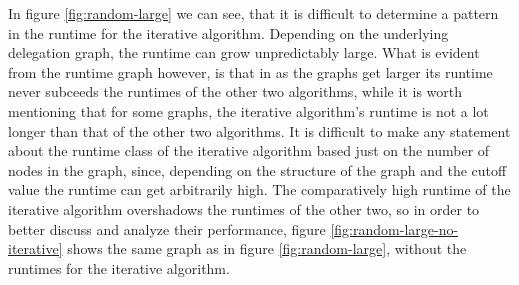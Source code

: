In figure \ref{fig:random-large} we can see, that it is difficult to determine a pattern in the runtime for the iterative algorithm. Depending on the underlying delegation graph, the runtime can grow unpredictably large. What is evident from the runtime graph however, is that in as the graphs get larger its runtime never subceeds the runtimes of the other two algorithms, while it is worth mentioning that for some graphs, the iterative algorithm's runtime is not a lot longer than that of the other two algorithms. It is difficult to make any statement about the runtime class of the iterative algorithm based just on the number of nodes in the graph, since, depending on the structure of the graph and the cutoff value the runtime can get arbitrarily high. The comparatively high runtime of the iterative algorithm overshadows the runtimes of the other two, so in order to better discuss and analyze their performance, figure \ref{fig:random-large-no-iterative} shows the same graph as in figure \ref{fig:random-large}, without the runtimes for the iterative algorithm.


